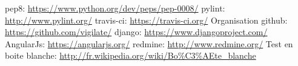 \noindent
pep8: \url{https://www.python.org/dev/peps/pep-0008/} \newline
pylint: \url{http://www.pylint.org/} \newline
travis-ci: \url{https://travis-ci.org/} \newline
Organisation github: \url{https://github.com/vigilate/} \newline
django: \url{https://www.djangoproject.com/} \newline
AngularJs: \url{https://angularjs.org/} \newline
redmine: \url{http://www.redmine.org/} \newline
Test en boite blanche: \url{http://fr.wikipedia.org/wiki/Bo%C3%AEte_blanche} \newline